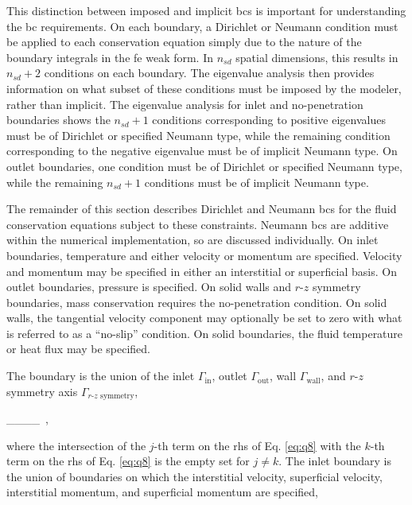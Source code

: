 This distinction between imposed and implicit \glspl{bc} is important for understanding the \gls{bc} requirements. On each boundary, a Dirichlet or Neumann condition must be applied to each conservation equation simply due to the nature of the boundary integrals in the \gls{fe} weak form. In \(n_{sd}\) spatial dimensions, this results in \(n_{sd}+2\) conditions on each boundary. The eigenvalue analysis then provides information on what subset of these conditions must be imposed by the modeler, rather than implicit. The eigenvalue analysis for inlet and no-penetration boundaries shows the \(n_{sd}+1\) conditions corresponding to positive eigenvalues must be of Dirichlet or specified Neumann type, while the remaining condition corresponding to the negative eigenvalue must be of implicit Neumann type. On outlet boundaries, one condition must be of Dirichlet or specified Neumann type, while the remaining \(n_{sd}+1\) conditions must be of implicit Neumann type. 

The remainder of this section describes Dirichlet and Neumann \glspl{bc} for the fluid conservation equations subject to these constraints. Neumann \glspl{bc} are additive within the numerical implementation, so are discussed individually. On inlet boundaries, temperature and either velocity or momentum are specified. Velocity and momentum may be specified in either an interstitial or superficial basis. On outlet boundaries, pressure is specified. On solid walls and \(r\)-\(z\) symmetry boundaries, mass conservation requires the no-penetration condition. On solid walls, the tangential velocity component may optionally be set to zero with what is referred to as a ``no-slip'' condition. On solid boundaries, the fluid temperature or heat flux may be specified. 

The boundary is the union of the inlet \(\Gamma_\text{in}\), outlet \(\Gamma_\text{out}\), wall \(\Gamma_\text{wall}\), and $r$-$z$ symmetry axis \(\Gamma_\text{$r$-$z$ symmetry}\),

\beq
\label{eq:q8}
\Gamma\equiv\Gamma_\cup\Gamma_\cup\Gamma_\cup\Gamma_\ ,
\eeq

\noindent where the intersection of the \(j\)-th term on the \gls{rhs} of Eq. \eqref{eq:q8} with the \(k\)-th term on the \gls{rhs} of Eq. \eqref{eq:q8} is the empty set for \(j\neq k\). The inlet boundary is the union of boundaries on which the interstitial velocity, superficial velocity, interstitial momentum, and superficial momentum are specified,

